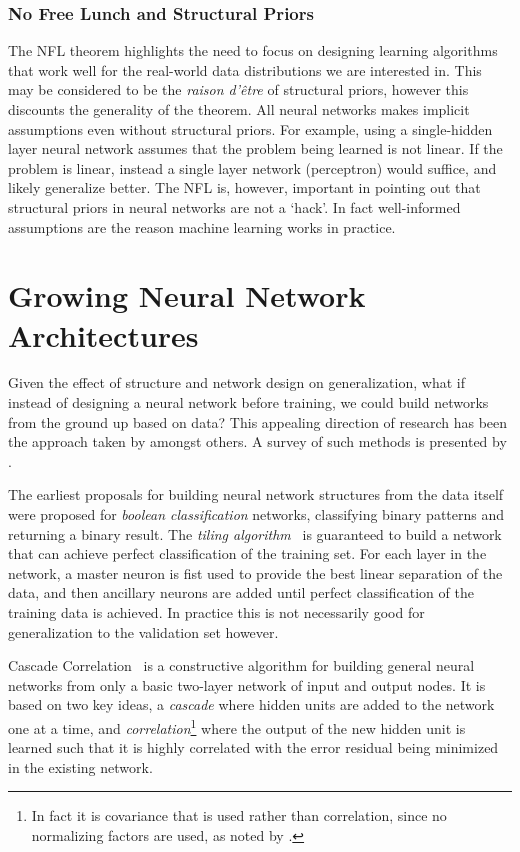 \documentclass[thesis]{subfiles}
\begin{document}
\subsubsection{No Free Lunch and Structural Priors}
The NFL theorem highlights the need to focus on designing learning algorithms that work well for the real-world data distributions we are interested in. This may be considered to be the \emph{raison d'\^{e}tre} of structural priors, however this discounts the generality of the theorem. All neural networks makes implicit assumptions even without structural priors. For example, using a single-hidden  layer neural network assumes that the problem being learned is not linear. If the problem is linear, instead a single layer network (perceptron) would suffice, and likely generalize better. The NFL is, however, important in pointing out that structural priors in neural networks are not a `hack'. In fact well-informed assumptions are the reason machine learning works in practice.

\section{Growing Neural Network Architectures}
	Given the effect of structure and network design on generalization, what if instead of designing a neural network before training, we could build networks from the ground up based on data? This appealing direction of research has been the approach taken by \citet{mezard1989learning,Fahlman1989,MacKay91,mackay1992practical,hypernetworks} amongst others. A survey of such methods is presented by \citet{parekh2000constructive}.
	
	The earliest proposals for building neural network structures from the data itself were proposed for \emph{boolean classification} networks, \ie classifying binary patterns and returning a binary result. The \emph{tiling algorithm}~\citep{mezard1989learning} is guaranteed to build a network that can achieve perfect classification of the training set. For each layer in the network, a master neuron is fist used to provide the best linear separation of the data, and then ancillary neurons are added until perfect classification of the training data is achieved. In practice this is not necessarily good for generalization to the validation set however. 
	
	Cascade Correlation~\citep{Fahlman1989} is a constructive algorithm for building general neural networks from only a basic two-layer network of input and output nodes. It is based on two key ideas, a \emph{cascade} where hidden units are added to the network one at a time, and \emph{correlation}\footnote{In fact it is covariance that is used rather than correlation, since no normalizing factors are used, as noted by \citet{Fahlman1989}.} where the output of the new hidden unit is learned such that it is highly correlated with the error residual being minimized in the existing network.
	
\end{document}

